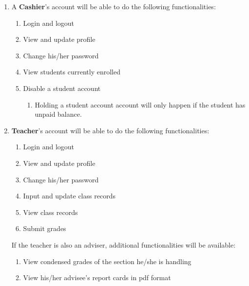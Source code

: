 \documentclass[11pt,a4paper,titlepage]{article}
\begin{document}
\begin{enumerate}
    \item A \textbf{Cashier}'s account will be able to do the following functionalities:
    \begin{enumerate}
        \item Login and logout
        \item View and update profile
        \item Change his/her password
        \item View students currently enrolled
        \item Disable a student account
        \begin{enumerate}
            \item Holding a student account account will only happen if the student has unpaid balance.
        \end{enumerate}
    \end{enumerate}

    \item \textbf{Teacher}'s account will be able to do the following functionalities: 
    \begin{enumerate}
        \item Login and logout
        \item View and update profile
        \item Change his/her password
        \item Input and update class records
        \item View class records
        \item Submit grades
    \end{enumerate}

    If the teacher is also an adviser, additional functionalities will be available:

    \begin{enumerate}
        \item View condensed grades of the section he/she is handling
        \item View his/her advisee's report cards in pdf format
        

\end{enumerate}
\end{enumerate}
\end{document}
